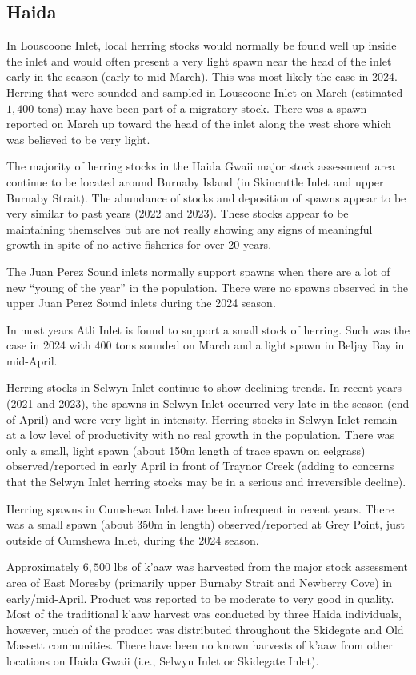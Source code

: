 \subsection{Haida}

In Louscoone Inlet, local herring stocks would normally be found
well up inside the inlet and would often present a very light spawn
near the head of the inlet early in the season (early to mid-March).
This was most likely the case in 2024.
Herring that were sounded and sampled in Louscoone Inlet on March 
(estimated $1,400$ tons) may have been part of a migratory stock.
There was a spawn reported on March  up toward the head of the inlet
along the west shore which was believed to be very light.

The majority of herring stocks in the Haida Gwaii major stock assessment area
continue to be located around Burnaby Island
(in Skincuttle Inlet and upper Burnaby Strait).
The abundance of stocks and deposition of spawns appear to be
very similar to past years (2022 and 2023).
These stocks appear to be maintaining themselves but
are not really showing any signs of meaningful growth
in spite of no active fisheries for over 20 years.

The Juan Perez Sound inlets normally support spawns
when there are a lot of new “young of the year” in the population.
There were no spawns observed in the upper Juan Perez Sound inlets
during the 2024 season.

In most years Atli Inlet is found to support a small stock of herring.
Such was the case in 2024 with $400$ tons sounded on March  and
a light spawn in Beljay Bay in mid-April. 

Herring stocks in Selwyn Inlet continue to show declining trends.
In recent years (2021 and 2023),
the spawns in Selwyn Inlet occurred very late in the season (end of April) and
were very light in intensity.
Herring stocks in Selwyn Inlet remain at a low level of productivity
with no real growth in the population.
There was only a small, light spawn
(about 150m length of trace spawn on eelgrass) observed/reported in early April
in front of Traynor Creek
(adding to concerns that the Selwyn Inlet herring stocks
may be in a serious and irreversible decline).

Herring spawns in Cumshewa Inlet have been infrequent in recent years.
There was a small spawn (about 350m in length) observed/reported at Grey Point,
just outside of Cumshewa Inlet, during the 2024 season.

Approximately $6,500$ lbs of k’aaw was harvested
from the major stock assessment area of East Moresby
(primarily upper Burnaby Strait and Newberry Cove) in early/mid-April.
Product was reported to be moderate to very good in quality.
Most of the traditional k’aaw harvest was conducted by three Haida individuals,
however, much of the product was distributed throughout the
Skidegate and Old Massett communities.
There have been no known harvests of k’aaw from other locations on Haida Gwaii
(i.e., Selwyn Inlet or Skidegate Inlet).
